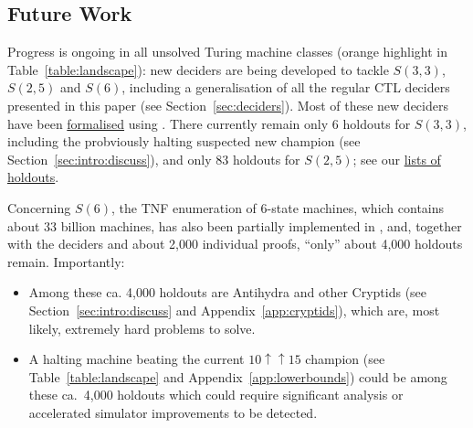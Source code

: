 \documentclass[a4paper,british]{article}
\theoremstyle{definition} %
\numberwithin{equation}{section}
\theoremstyle{definition} %
\begin{document}
















% 

\subsection{Future Work}

Progress is ongoing in all unsolved Turing machine classes (orange highlight in Table~\ref{table:landscape}): new deciders are being developed to tackle $S(3,3)$, $S(2,5)$ and $S(6)$, including a generalisation of all the regular CTL deciders presented in this paper (see Section~\ref{sec:deciders}). Most of these new deciders have been  \href{https://github.com/ccz181078/busycoq/tree/BB6/verify}{formalised} using \Coq. There currently remain only $6$ holdouts for $S(3,3)$, including the probviously halting suspected new champion (see Section~\ref{sec:intro:discuss}), and only $83$ holdouts for $S(2,5)$; see our \href{https://wiki.bbchallenge.org/wiki/Holdouts_lists}{lists of holdouts}.

Concerning $S(6)$, the TNF enumeration of 6-state machines, which contains about 33 billion machines, has also been partially implemented in \Coq, and, together with the deciders and about 2,000 individual proofs, ``only'' about 4,000 holdouts remain. Importantly:
\begin{itemize}[label=--]
    \item Among these ca. 4,000 holdouts are Antihydra and other Cryptids (see Section~\ref{sec:intro:discuss} and Appendix~\ref{app:cryptids}), which are, most likely, extremely hard problems to solve.
    \item A halting machine beating the current $10\uparrow\uparrow15$ champion (see Table~\ref{table:landscape} and Appendix~\ref{app:lowerbounds}) could be among these ca.~4,000 holdouts which could require significant analysis or accelerated simulator improvements to be detected.
\end{itemize}
\end{document}
